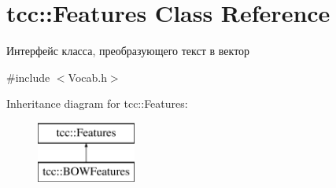 \hypertarget{classtcc_1_1_features}{}\section{tcc\+:\+:Features Class Reference}
\label{classtcc_1_1_features}


Интерфейс класса, преобразующего текст в вектор  




{\ttfamily \#include $<$Vocab.\+h$>$}

Inheritance diagram for tcc\+:\+:Features\+:\begin{figure}[H]
\begin{center}
\leavevmode
\includegraphics[height=2.000000cm]{classtcc_1_1_features}
\end{center}
\end{figure}

